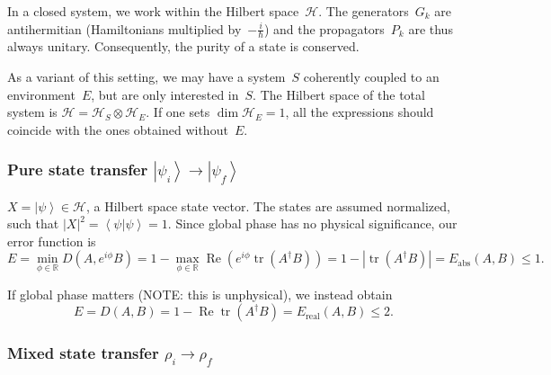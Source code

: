 \documentclass[aps, pra, a4paper, longbibliography, superscriptaddress]{revtex4-1}
\newcommand{\be}{\begin{equation}}
\newcommand{\ee}{\end{equation}}
\newcommand{\R}{{\mathbb R}}  %
\newcommand{\ket}[1]{\left| #1 \right \rangle}
\newcommand{\bra}[1]{\left \langle #1 \right|}
\newcommand{\braket}[2]{\left \langle #1 | #2 \right \rangle}
\newcommand{\ketbra}[2]{\left| #1 \right \rangle \left \langle #2 \right|}
\newcommand{\hilb}[1]{\mathcal{#1}}
\DeclareMathOperator{\tr}{tr}
\DeclareMathOperator{\re}{Re}
\DeclareMathOperator{\cvec}{vec}
\begin{document}
In a closed system, we work within the Hilbert space~$\hilb{H}$.
The generators~$G_k$ are antihermitian (Hamiltonians multiplied by~$-\frac{i}{\hbar}$)
and the propagators~$P_k$ are thus always
unitary. Consequently, the purity of a state is conserved.

As a variant of this setting,
we may have a system~$S$ coherently coupled to an
environment~$E$, but are only interested in~$S$.
The Hilbert space of the total system is
$\hilb{H} = \hilb{H}_S \otimes \hilb{H}_E$.
If one sets $\dim \hilb{H}_E = 1$, all the expressions should coincide with the ones obtained without~$E$.


\subsubsection{Pure state transfer $\ket{\psi_i} \to \ket{\psi_f}$}
\label{sec:closed-pure}

$X = \ket{\psi} \in \hilb{H}$, a Hilbert space state vector.
The states are assumed normalized, such that $|X|^2 = \braket{\psi}{\psi} = 1$.
Since global phase has no physical significance, our error function is
\be
E = \min_{\phi \in \R} D(A, e^{i \phi} B)
= 1 -\max_{\phi \in \R} \re \left( e^{i \phi} \tr(A^\dagger B)\right)
= 1 -|\tr(A^\dagger B)|
= E_\text{abs}(A, B) \le 1.
\ee

\begin{comment}
This result can also be obtained using the mixed state formula in the
vec representation, with $\rho = \ketbra{\psi}{\psi}$ and thus
$X = \cvec(\rho) = \ket{\psi^*} \otimes \ket{\psi}$.
The fidelity diagram breaks into two pieces and
we obtain
\be
f(A, B)
= (\re) \left|(\tr) \bra{\psi_f}  P_n \cdots P_1 \ket{\psi_i} \right|^2.
\ee
with $0 \le f(A, B) \le 1$.
Thus the problem simplifies back into Hilbert space
(albeit with an extra absolute value squared in the expression for the fidelity), and we may equivalently
choose $X = \ket{\psi}$.
\end{comment}


If global phase matters (NOTE: this is unphysical), we instead obtain
\be
E
= D(A, B)
= 1 -\re \tr(A^\dagger B)
= E_\text{real}(A, B) \le 2.
\ee



\subsubsection{Mixed state transfer $\rho_i \to \rho_f$}
\label{sec:closed-mixed}
\end{document}
